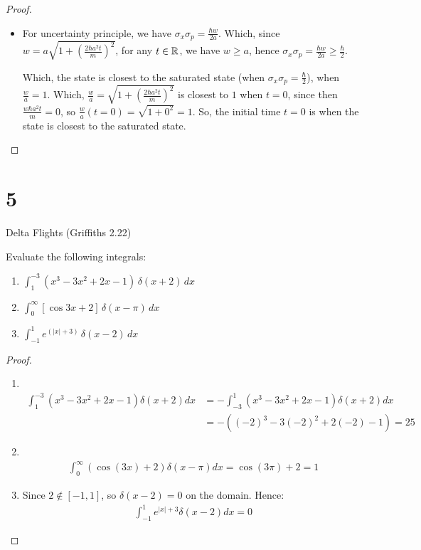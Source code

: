 \documentclass{article}
\begin{document}
\begin{proof}
\begin{itemize}
        \hfil

        \item[5.] For uncertainty principle, we have $\sigma_x \sigma_p = \frac{\hbar w}{2a}$. Which, since $w = a\sqrt{1+\left(\frac{2\hbar a^2t}{m}\right)^2}$, for any $t\in\mathbb{R}$, we have $w\geq a$, hence $\sigma_x\sigma_p = \frac{\hbar w}{2a}\geq \frac{\hbar}{2}$.
        
        Which, the state is closest to the saturated state (when $\sigma_x\sigma_p=\frac{\hbar}{2}$), when $\frac{w}{a}=1$. Which, $\frac{w}{a}=\sqrt{1+\left(\frac{2\hbar a^2t}{m}\right)^2}$ is closest to $1$ when $t=0$, since then $\frac{w\hbar a^2t}{m}=0$, so $\frac{w}{a}(t=0) = \sqrt{1+0^2}=1$. So, the initial time $t=0$ is when the state is closest to the saturated state. 
    \end{itemize}
\end{proof}

\newpage

\section*{5}
\begin{ques}\label{q5}
Delta Flights (Griffiths 2.22)

Evaluate the following integrals:

\begin{enumerate}
\item  $\int_{1}^{-3} (x^3 - 3x^2 + 2x - 1) \, \delta(x + 2) \, dx$  
\item  $\int_{0}^{\infty} [\cos 3x + 2] \, \delta(x - \pi) \, dx$  
\item  $\int_{-1}^{1} e^{(|x| + 3)} \, \delta(x - 2) \, dx$
\end{enumerate}
\end{ques}

\begin{proof}

    \hfil

    \begin{enumerate}
        \item $\quad$
        \begin{align}
            \int_{1}^{-3}(x^3-3x^2+2x-1)\delta(x+2)dx &= -\int_{-3}^{1}(x^3-3x^2+2x-1)\delta(x+2)dx\\
            &= -((-2)^3-3(-2)^2+2(-2)-1) = 25
        \end{align}
        \item $\quad$
        \begin{align}
            \int_{0}^{\infty}(\cos(3x)+2)\delta(x-\pi)dx = \cos(3\pi)+2=1
        \end{align}
        \item Since $2\notin [-1,1]$, so $\delta(x-2)=0$ on the domain. Hence:
        \begin{align}
            \int_{-1}^{1}e^{|x|+3}\delta(x-2)dx = 0
        \end{align}
    \end{enumerate}
\end{proof}
\end{document}
